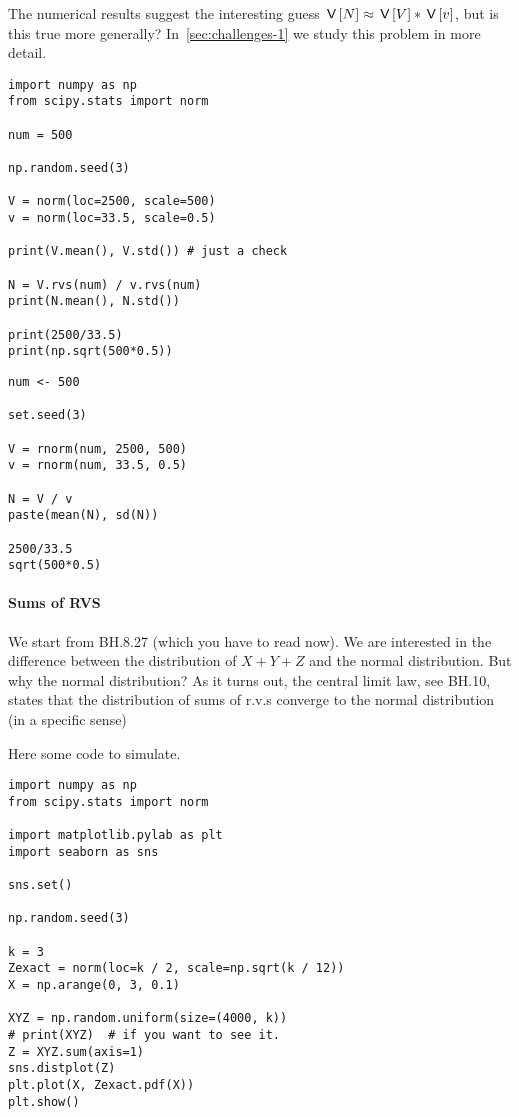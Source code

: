\documentclass[assignments]{subfiles}
\begin{document}
The numerical results suggest the interesting guess $\,\mathsf{V}\left[N\right] \approx \,\mathsf{V}\left[V\right] * \,\mathsf{V}\left[v\right]$, but is this true more generally?
In~\cref{sec:challenges-1} we study this problem in more detail.

\begin{verbatim}
import numpy as np
from scipy.stats import norm

num = 500

np.random.seed(3)

V = norm(loc=2500, scale=500)
v = norm(loc=33.5, scale=0.5)

print(V.mean(), V.std()) # just a check

N = V.rvs(num) / v.rvs(num)
print(N.mean(), N.std())

print(2500/33.5)
print(np.sqrt(500*0.5))
\end{verbatim}

\begin{verbatim}
num <- 500

set.seed(3)

V = rnorm(num, 2500, 500)
v = rnorm(num, 33.5, 0.5)

N = V / v
paste(mean(N), sd(N))

2500/33.5
sqrt(500*0.5)
\end{verbatim}



\paragraph{Sums of RVS}

We start from BH.8.27 (which you have to read now).  We are interested in the difference between the distribution of $X+Y+Z$ and the normal distribution. But why the normal distribution? As it turns out, the central limit law, see BH.10, states that the distribution of sums of r.v.s converge to the normal distribution (in a specific sense)

Here some code to simulate.

\begin{verbatim}
import numpy as np
from scipy.stats import norm

import matplotlib.pylab as plt
import seaborn as sns

sns.set()

np.random.seed(3)

k = 3
Zexact = norm(loc=k / 2, scale=np.sqrt(k / 12))
X = np.arange(0, 3, 0.1)

XYZ = np.random.uniform(size=(4000, k))
# print(XYZ)  # if you want to see it.
Z = XYZ.sum(axis=1)
sns.distplot(Z)
plt.plot(X, Zexact.pdf(X))
plt.show()
\end{verbatim}
\end{document}
